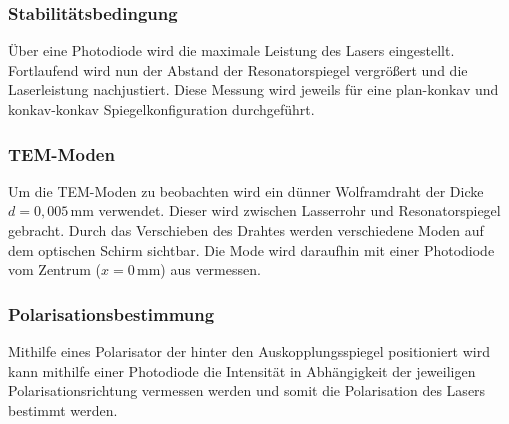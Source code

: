 \subsubsection{Stabilitätsbedingung}
Über eine Photodiode wird die maximale Leistung des Lasers eingestellt. Fortlaufend wird nun der Abstand der Resonatorspiegel
vergrößert und die Laserleistung nachjustiert. Diese Messung wird jeweils für eine plan-konkav und konkav-konkav Spiegelkonfiguration durchgeführt.
\subsubsection{TEM-Moden}
Um die TEM-Moden zu beobachten wird ein dünner Wolframdraht der Dicke $d=0,005\,$mm verwendet. Dieser wird zwischen Lasserrohr und Resonatorspiegel gebracht.
Durch das Verschieben des Drahtes werden verschiedene Moden auf dem optischen Schirm sichtbar. Die Mode wird daraufhin mit einer Photodiode vom Zentrum ($x=0\,$mm) aus vermessen.
\subsubsection{Polarisationsbestimmung}
Mithilfe eines Polarisator der hinter den Auskopplungsspiegel positioniert wird kann mithilfe einer Photodiode die Intensität in Abhängigkeit
der jeweiligen Polarisationsrichtung vermessen werden und somit die Polarisation des Lasers bestimmt werden.

\label{sec:Durchfuehrung}
